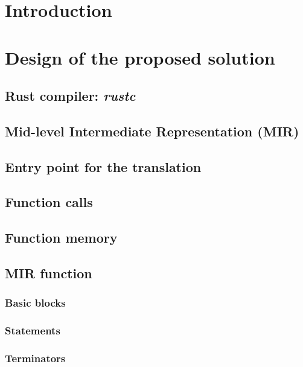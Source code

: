 \documentclass[12pt, oneside]{book}
\begin{document}




\chapter{Introduction}







\bigskip

\chapter{Design of the proposed solution}

\section{Rust compiler: \emph{rustc}}
\section{Mid-level Intermediate Representation (MIR)}
\section{Entry point for the translation}
\section{Function calls}
\section{Function memory}
\section{MIR function}
\subsection{Basic blocks}
\subsection{Statements}
\subsection{Terminators}
\end{document}
